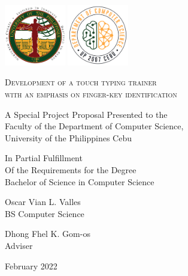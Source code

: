 \documentclass{report}
\begin{document}
\begin{titlepage}
	\centering

	\hspace{0pt}
	\vfill

	\includegraphics[width=0.2\textwidth]{upc.png}
	\includegraphics[width=0.2\textwidth]{dcs.png}
	\par\vspace{1cm}

	\textsc{Development of a touch typing trainer\\with an emphasis on finger-key identification }
	\par\vspace{0.5cm}

	\hrulefill
	\par\vspace{0.25cm}
	A Special Project Proposal Presented to the\\
	Faculty of the Department of Computer Science,\\
	University of the Philippines Cebu

	\par\vspace{0.25cm}
	In Partial Fulfillment\\
	Of the Requirements for the Degree\\
	Bachelor of Science in Computer Science\\
	\par\vspace{0.25cm}
	\hrulefill
	\par\vspace{0.5cm}

	Oscar Vian L. Valles\\
	BS Computer Science
	\par\vspace{0.5cm}

	Dhong Fhel K. Gom-os\\
	Adviser
	\par\vspace{0.5cm}

	February 2022
	\vfill
	\hspace{0pt}
\end{titlepage}
\newpage
\end{document}
